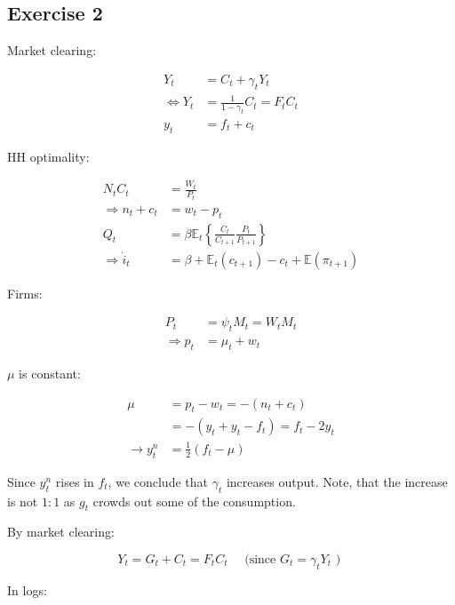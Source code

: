 {
\subsection*{Exercise 2}

Market clearing: 

\begin{align*}
    Y_{t} &= C_{t}+\gamma_{t} Y_{t} \\
    \Leftrightarrow Y_{t} &= \frac{1}{1-\gamma_{t}} C_{t}=F_{t} C_{t} \\
    y_{t} &= f_{t} + c_{t}
\end{align*}

HH optimality:

\begin{align*}
    N_{t} C_{t} &= \frac{W_{t}}{P_{t}} \\
    \Longrightarrow n_{t}+c_{t} &= w_{t}-p_{t} \\
    Q_{t} &= \beta \mathbb{E}_{t}\left\{\frac{C_{t}}{C_{t+1}} \frac{P_{t}}{P_{t+1}}\right\} \\
    \Rightarrow \dot{i}_{t} &= \beta+\mathbb{E}_{t}\left(c_{t+1}\right)-c_{t}+\mathbb{E}\left(\pi_{t+1}\right)
\end{align*}

Firms: 

\begin{align*}
    P_{t} &= \psi_{t} M_{t}=W_{t} M_{t} \\
    \Rightarrow p_{t} &= \mu_{t}+w_{t}
\end{align*}

\begin{enumerate}[label=(\alph*)]
{\item 
$\mu$ is constant:

$$
\begin{aligned}
\mu & =p_{t}-w_{t}=-\left(n_{t}+c_{t}\right) \\
& =-\left(y_{t}+y_{t}-f_{t}\right)=f_{t}-2 y_{t} \\
\longrightarrow y_{t}^{n} & =\frac{1}{2}\left(f_{t}-\mu\right)
\end{aligned}
$$

Since $y^{n}_t$ rises in $f_{t}$, we conclude that $\gamma_{t}$ increases output. Note, that the increase is not $1: 1$ as $g_t$ crowds out some of the consumption.
}
{
\item 
By market clearing:

$$
Y_{t}=G_{t}+C_{t}=F_{t} C_{t} \quad \text { (since } G_{t}=\gamma_{t} Y_{t} \text { ) }
$$

In logs:

}
\end{enumerate}}
